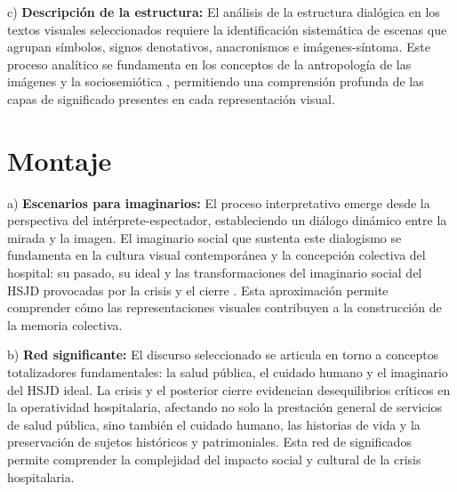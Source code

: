 c) \textbf{Descripción de la estructura:} El análisis de la estructura dialógica en los textos visuales seleccionados requiere la identificación sistemática de escenas que agrupan símbolos, signos denotativos, anacronismos e imágenes-síntoma. Este proceso analítico se fundamenta en los conceptos de la antropología de las imágenes y la sociosemiótica \parencite{Abril2007}, permitiendo una comprensión profunda de las capas de significado presentes en cada representación visual.

\section{Montaje}

a) \textbf{Escenarios para imaginarios:} El proceso interpretativo emerge desde la perspectiva del intérprete-espectador, estableciendo un diálogo dinámico entre la mirada y la imagen. El imaginario social que sustenta este dialogismo se fundamenta en la cultura visual contemporánea y la concepción colectiva del hospital: su pasado, su ideal y las transformaciones del imaginario social del HSJD provocadas por la crisis y el cierre \parencite{Gongora2013}. Esta aproximación permite comprender cómo las representaciones visuales contribuyen a la construcción de la memoria colectiva.

b) \textbf{Red significante:} El discurso seleccionado se articula en torno a conceptos totalizadores fundamentales: la salud pública, el cuidado humano y el imaginario del HSJD ideal. La crisis y el posterior cierre evidencian desequilibrios críticos en la operatividad hospitalaria, afectando no solo la prestación general de servicios de salud pública, sino también el cuidado humano, las historias de vida y la preservación de sujetos históricos y patrimoniales. Esta red de significados permite comprender la complejidad del impacto social y cultural de la crisis hospitalaria.
